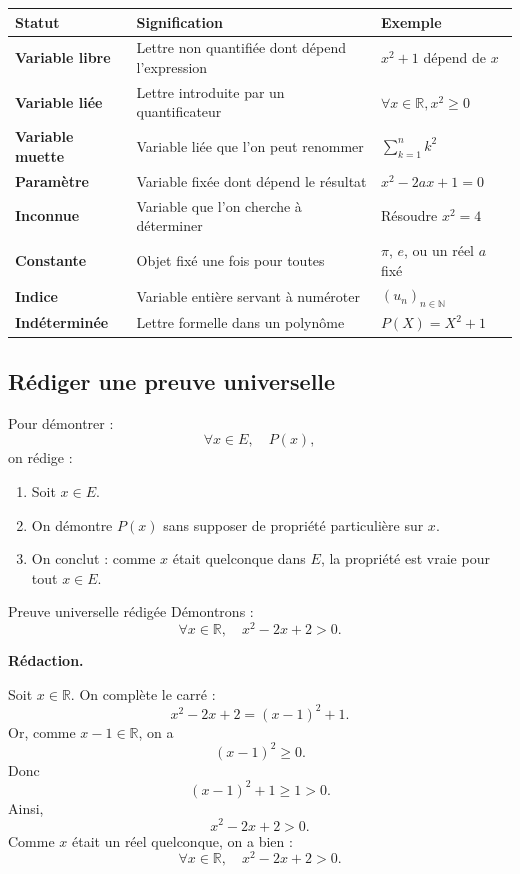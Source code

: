 \documentclass[11pt,a4paper]{article}
\renewcommand{\arraystretch}{1.25}
\begin{document}
\begin{center}
\renewcommand{\arraystretch}{1.35}
\begin{tabularx}{\textwidth}{|>{\bfseries}l|X|X|}
\hline
Statut & Signification & Exemple \\
\hline
Variable libre & Lettre non quantifiée dont dépend l'expression & $x^2+1$ dépend de $x$ \\
\hline
Variable liée & Lettre introduite par un quantificateur & $\forall x\in\mathbb{R}, x^2\geq0$ \\
\hline
Variable muette & Variable liée que l'on peut renommer & $\sum_{k=1}^n k^2$ \\
\hline
Paramètre & Variable fixée dont dépend le résultat & $x^2-2ax+1=0$ \\
\hline
Inconnue & Variable que l'on cherche à déterminer & Résoudre $x^2=4$ \\
\hline
Constante & Objet fixé une fois pour toutes & $\pi$, $e$, ou un réel $a$ fixé \\
\hline
Indice & Variable entière servant à numéroter & $(u_n)_{n\in\mathbb{N}}$ \\
\hline
Indéterminée & Lettre formelle dans un polynôme & $P(X)=X^2+1$ \\
\hline
\end{tabularx}
\end{center}

\subsection{Rédiger une preuve universelle}

\begin{methodebox}
Pour démontrer :
\[
\forall x\in E,\quad P(x),
\]
on rédige :
\begin{enumerate}
    \item Soit $x\in E$.
    \item On démontre $P(x)$ sans supposer de propriété particulière sur $x$.
    \item On conclut : comme $x$ était quelconque dans $E$, la propriété est vraie pour tout $x\in E$.
\end{enumerate}
\end{methodebox}

\begin{exemplebox}{Preuve universelle rédigée}{}
Démontrons :
\[
\forall x\in\mathbb{R},\quad x^2-2x+2>0.
\]

\textbf{Rédaction.}

Soit $x\in\mathbb{R}$. On complète le carré :
\[
x^2-2x+2=(x-1)^2+1.
\]
Or, comme $x-1\in\mathbb{R}$, on a
\[
(x-1)^2\geq 0.
\]
Donc
\[
(x-1)^2+1\geq 1>0.
\]
Ainsi,
\[
x^2-2x+2>0.
\]
Comme $x$ était un réel quelconque, on a bien :
\[
\forall x\in\mathbb{R},\quad x^2-2x+2>0.
\]
\end{exemplebox}
\end{document}
